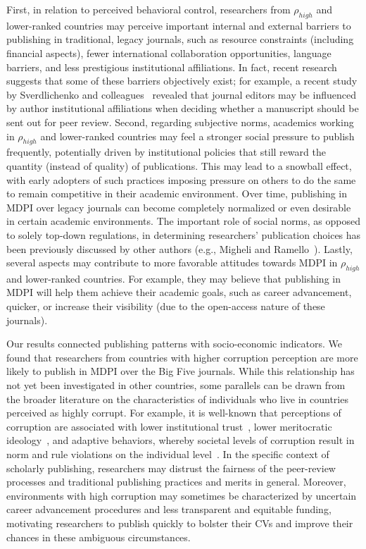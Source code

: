 \documentclass[amsfonts, amssymb, prl, superscriptaddress, notitlepage, twocolumn, nofootinbib]{revtex4-2}
\begin{document}
First, in relation to perceived behavioral control, researchers from $\rho_{high}$ and lower-ranked countries may perceive important internal and external barriers to publishing in traditional, legacy journals, such as resource constraints (including financial aspects), fewer international collaboration opportunities, language barriers, and less prestigious institutional affiliations. In fact, recent research suggests that some of these barriers objectively exist; for example, a recent study by Sverdlichenko and colleagues~\cite{sverdlichenko2022} revealed that journal editors may be influenced by author institutional affiliations when deciding whether a manuscript should be sent out for peer review. Second, regarding subjective norms, academics working in $\rho_{high}$ and lower-ranked countries may feel a stronger social pressure to publish frequently, potentially driven by institutional policies that still reward the quantity (instead of quality) of publications. This may lead to a snowball effect, with early adopters of such practices imposing pressure on others to do the same to remain competitive in their academic environment. Over time, publishing in MDPI over legacy journals can become completely normalized or even desirable in certain academic environments. The important role of social norms, as opposed to solely top-down regulations, in determining researchers' publication choices has been previously discussed by other authors (e.g., Migheli and Ramello~\cite{migheli2013}). Lastly, several aspects may contribute to more favorable attitudes towards MDPI in $\rho_{high}$ and lower-ranked countries. For example, they may believe that publishing in MDPI will help them achieve their academic goals, such as career advancement, quicker, or increase their visibility (due to the open-access nature of these journals).

Our results connected publishing patterns with socio-economic indicators. We found that researchers from countries with higher corruption perception are more likely to publish in MDPI over the Big Five journals. While this relationship has not yet been investigated in other countries, some parallels can be drawn from the broader literature on the characteristics of individuals who live in countries perceived as highly corrupt. For example, it is well-known that perceptions of corruption are associated with lower institutional trust~\cite{hakhverdian2012}, lower meritocratic ideology~\cite{tan2017}, and adaptive behaviors, whereby societal levels of corruption result in norm and rule violations on the individual level~\cite{kobis2018}. In the specific context of scholarly publishing, researchers may distrust the fairness of the peer-review processes and traditional publishing practices and merits in general. Moreover, environments with high corruption may sometimes be characterized by uncertain career advancement procedures and less transparent and equitable funding, motivating researchers to publish quickly to bolster their CVs and improve their chances in these ambiguous circumstances. 
\end{document}
